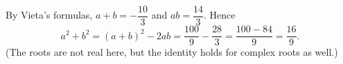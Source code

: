 By Vieta's formulas, $a+b=-\dfrac{10}{3}$ and $ab=\dfrac{14}{3}$. Hence
\[a^2+b^2=(a+b)^2-2ab=\dfrac{100}{9}-\dfrac{28}{3}=\dfrac{100-84}{9}=\boxed{\dfrac{16}{9}}.\]
(The roots are not real here, but the identity holds for complex roots as well.)
